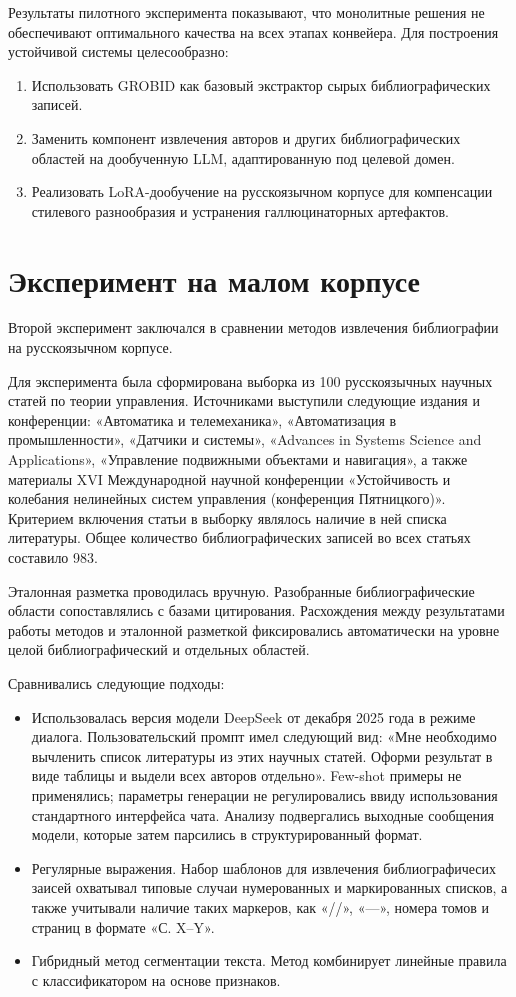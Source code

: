 Результаты пилотного эксперимента показывают, что монолитные решения не обеспечивают оптимального качества на всех этапах конвейера. Для построения устойчивой системы целесообразно:
\begin{enumerate}
    \item Использовать GROBID как базовый экстрактор сырых библиографических записей.
    \item Заменить компонент извлечения авторов и других библиографических областей на дообученную LLM, адаптированную под целевой домен.
    \item Реализовать LoRA-дообучение на русскоязычном корпусе для компенсации стилевого разнообразия и устранения галлюцинаторных артефактов.
\end{enumerate} 

\section{Эксперимент на малом корпусе}
Второй эксперимент заключался в сравнении методов извлечения библиографии на русскоязычном корпусе. 

Для эксперимента была сформирована выборка из 100 русскоязычных научных статей по теории управления. Источниками выступили следующие издания и конференции: «Автоматика и телемеханика», «Автоматизация в промышленности», «Датчики и системы», «Advances in Systems Science and Applications», «Управление подвижными объектами и навигация», а также материалы XVI Международной научной конференции «Устойчивость и колебания нелинейных систем управления (конференция Пятницкого)». Критерием включения статьи в выборку являлось наличие в ней списка литературы. Общее количество библиографических записей во всех статьях составило 983.

Эталонная разметка проводилась вручную. Разобранные библиографические области сопоставлялись с базами цитирования. Расхождения между результатами работы методов и эталонной разметкой фиксировались автоматически на уровне целой библиографический и отдельных областей.

Сравнивались следующие подходы:
\begin{itemize}
    \item Использовалась версия модели DeepSeek от декабря 2025 года в режиме диалога. Пользовательский промпт имел следующий вид: «Мне необходимо вычленить список литературы из этих научных статей. Оформи результат в виде таблицы и выдели всех авторов отдельно». Few-shot примеры не применялись; параметры генерации не регулировались ввиду использования стандартного интерфейса чата. Анализу подвергались выходные сообщения модели, которые затем парсились в структурированный формат.
    \item Регулярные выражения. Набор шаблонов для извлечения библиографичесих заисей охватывал типовые случаи нумерованных и маркированных списков, а также учитывали наличие таких маркеров, как «//», «—», номера томов и страниц в формате «С. X–Y».
    \item Гибридный метод сегментации текста. Метод комбинирует линейные правила с классификатором на основе признаков.
\end{itemize}

